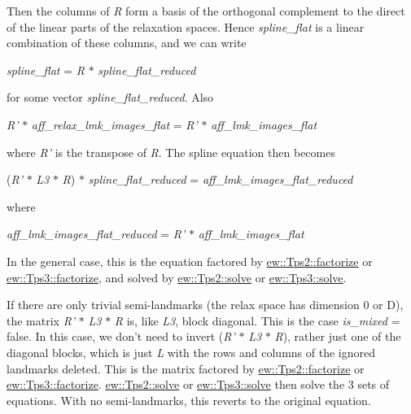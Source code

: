 Then the columns of {\itshape R\/} form a basis of the orthogonal complement to the direct of the linear parts of the relaxation spaces. Hence {\itshape spline\_\-flat\/} is a linear combination of these columns, and we can write \begin{center} {\itshape spline\_\-flat\/} = {\itshape R\/} $\ast$ {\itshape spline\_\-flat\_\-reduced\/} \end{center}  for some vector {\itshape spline\_\-flat\_\-reduced\/}. Also \begin{center} {\itshape R'\/} $\ast$ {\itshape aff\_\-relax\_\-lmk\_\-images\_\-flat\/} = {\itshape R'\/} $\ast$ {\itshape aff\_\-lmk\_\-images\_\-flat\/} \end{center}  where {\itshape R'\/} is the transpose of {\itshape R\/}. The spline equation then becomes \begin{center} ({\itshape R'\/} $\ast$ {\itshape L3\/} $\ast$ {\itshape R\/}) $\ast$ {\itshape spline\_\-flat\_\-reduced\/} = {\itshape aff\_\-lmk\_\-images\_\-flat\_\-reduced\/} \end{center}  where \begin{center} {\itshape aff\_\-lmk\_\-images\_\-flat\_\-reduced\/} = {\itshape R'\/} $\ast$ {\itshape aff\_\-lmk\_\-images\_\-flat\/} \end{center}  In the general case, this is the equation factored by \hyperlink{classew_1_1Tps2_a07f500b8a093d45384ee6d90dd2c226a}{ew::Tps2::factorize} or \hyperlink{classew_1_1Tps3_abc71d05432b69dcaab46b5a2e2dc5e2a}{ew::Tps3::factorize}, and solved by \hyperlink{classew_1_1Tps2_a4691d5181d87c9219d8fec679cfccdcc}{ew::Tps2::solve} or \hyperlink{classew_1_1Tps3_acf2ff420aa319fa03e4ae0efbdbb420a}{ew::Tps3::solve}.

If there are only trivial semi-\/landmarks (the relax space has dimension 0 or D), the matrix {\itshape R'\/} $\ast$ {\itshape L3\/} $\ast$ {\itshape R\/} is, like {\itshape L3\/}, block diagonal. This is the case {\itshape is\_\-mixed\/} = {\ttfamily false}. In this case, we don't need to invert ({\itshape R'\/} $\ast$ {\itshape L3\/} $\ast$ {\itshape R\/}), rather just one of the diagonal blocks, which is just {\itshape L\/} with the rows and columns of the ignored landmarks deleted. This is the matrix factored by \hyperlink{classew_1_1Tps2_a07f500b8a093d45384ee6d90dd2c226a}{ew::Tps2::factorize} or \hyperlink{classew_1_1Tps3_abc71d05432b69dcaab46b5a2e2dc5e2a}{ew::Tps3::factorize}. \hyperlink{classew_1_1Tps2_a4691d5181d87c9219d8fec679cfccdcc}{ew::Tps2::solve} or \hyperlink{classew_1_1Tps3_acf2ff420aa319fa03e4ae0efbdbb420a}{ew::Tps3::solve} then solve the 3 sets of equations. With no semi-\/landmarks, this reverts to the original equation.


